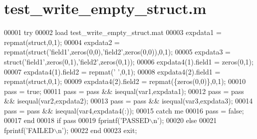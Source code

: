 \hypertarget{test__write__empty__struct_8m_source}{}\section{test\+\_\+write\+\_\+empty\+\_\+struct.\+m}
\label{test__write__empty__struct_8m_source}

\begin{DoxyCode}
00001 \textcolor{keywordflow}{try}
00002     load test\_write\_empty\_struct.mat
00003     expdata1 = repmat(\textcolor{keyword}{struct},0,1);
00004     expdata2 = repmat(\textcolor{keyword}{struct}(\textcolor{stringliteral}{'field1'},zeros(0,0),\textcolor{stringliteral}{'field2'},zeros(0,0)),0,1);
00005     expdata3 = \textcolor{keyword}{struct}(\textcolor{stringliteral}{'field1'},zeros(0,1),\textcolor{stringliteral}{'field2'},zeros(0,1));
00006     expdata4(1).field1 = zeros(0,1);
00007     expdata4(1).field2 = repmat(\textcolor{charliteral}{' '},0,1);
00008     expdata4(2).field1 = repmat(\textcolor{keyword}{struct},0,1);
00009     expdata4(2).field2 = repmat(\{zeros(0,0)\},0,1);
00010     pass = \textcolor{keyword}{true};
00011     pass = pass && isequal(var1,expdata1);
00012     pass = pass && isequal(var2,expdata2);
00013     pass = pass && isequal(var3,expdata3);
00014     pass = pass && isequal(var4,expdata4(:));
00015 \textcolor{keywordflow}{catch} me
00016     pass = \textcolor{keyword}{false};
00017 end
00018 \textcolor{keywordflow}{if} pass
00019     fprintf(\textcolor{stringliteral}{'PASSED\(\backslash\)n'});
00020 \textcolor{keywordflow}{else}
00021     fprintf(\textcolor{stringliteral}{'FAILED\(\backslash\)n'});
00022 end
00023 exit;
\end{DoxyCode}
